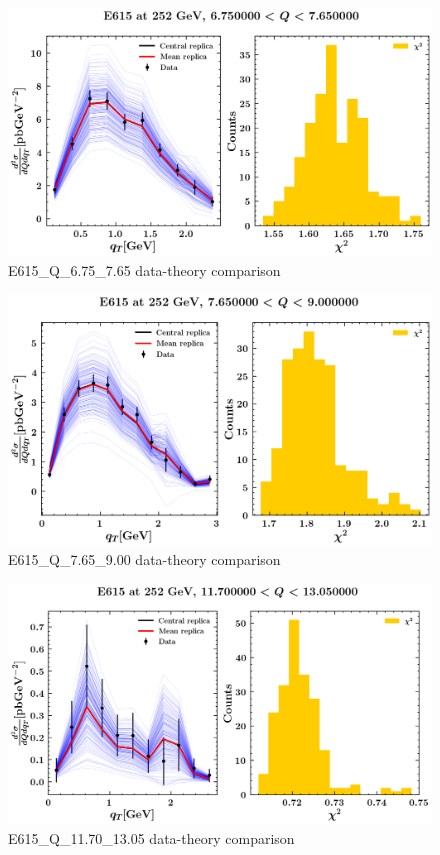 \documentclass[]{article}
\begin{document}
\begin{figure}
\centering
\includegraphics{pngplots/E615_Q_6.75_7.65.png}
\caption{E615\_Q\_6.75\_7.65 data-theory comparison}
\end{figure}

\begin{figure}
\centering
\includegraphics{pngplots/E615_Q_7.65_9.00.png}
\caption{E615\_Q\_7.65\_9.00 data-theory comparison}
\end{figure}

\begin{figure}
\centering
\includegraphics{pngplots/E615_Q_11.70_13.05.png}
\caption{E615\_Q\_11.70\_13.05 data-theory comparison}
\end{figure}
\end{document}
